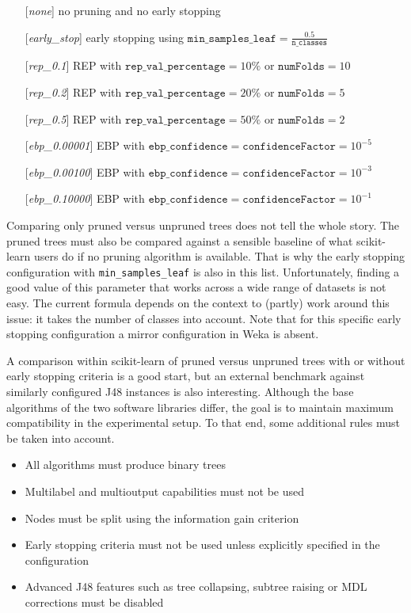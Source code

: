 \begin{itemize}
    \item[] [\emph{none}] no pruning and no early stopping
    \item[] [\emph{early\_stop}] early stopping using $\texttt{min\_samples\_leaf} = \frac{0.5}{\texttt{n\_classes}}$
    \item[] [\emph{rep\_0.1}] REP with $\texttt{rep\_val\_percentage} = 10\%$ or $\texttt{numFolds} = 10$
    \item[] [\emph{rep\_0.2}] REP with $\texttt{rep\_val\_percentage} = 20\%$ or $\texttt{numFolds} = 5$
    \item[] [\emph{rep\_0.5}] REP with $\texttt{rep\_val\_percentage} = 50\%$ or $\texttt{numFolds} = 2$
    \item[] [\emph{ebp\_0.00001}] EBP with $\texttt{ebp\_confidence} = \texttt{confidenceFactor} = 10^{-5}$
    \item[] [\emph{ebp\_0.00100}] EBP with $\texttt{ebp\_confidence} = \texttt{confidenceFactor} = 10^{-3}$
    \item[] [\emph{ebp\_0.10000}] EBP with $\texttt{ebp\_confidence} = \texttt{confidenceFactor} = 10^{-1}$
\end{itemize}

Comparing only pruned versus unpruned trees does not tell the whole story. The pruned trees must also be compared against a sensible baseline of what scikit-learn users do if no pruning algorithm is available. That is why the early stopping configuration with \texttt{min\_samples\_leaf} is also in this list. Unfortunately, finding a good value of this parameter that works across a wide range of datasets is not easy. The current formula depends on the context to (partly) work around this issue: it takes the number of classes into account. Note that for this specific early stopping configuration a mirror configuration in Weka is absent.

A comparison within scikit-learn of pruned versus unpruned trees with or without early stopping criteria is a good start, but an external benchmark against similarly configured J48 instances is also interesting. Although the base algorithms of the two software libraries differ, the goal is to maintain maximum compatibility in the experimental setup. To that end, some additional rules must be taken into account.

\begin{itemize}
    \item All algorithms must produce binary trees
    \item Multilabel and multioutput capabilities must not be used
    \item Nodes must be split using the information gain criterion
    \item Early stopping criteria must not be used unless explicitly specified in the configuration
    \item Advanced J48 features such as tree collapsing, subtree raising or MDL corrections must be disabled
\end{itemize}


